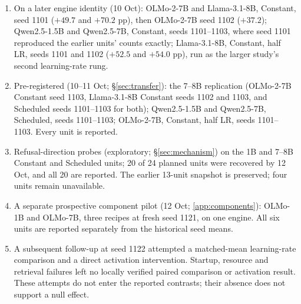 \documentclass{article}
\begin{document}
\begin{enumerate}
  \item On a later engine identity (10 Oct): OLMo-2-7B and Llama-3.1-8B,
        Constant, seed 1101 ($+49.7$ and $+70.2$ pp), then OLMo-2-7B seed 1102
        ($+37.2$); Qwen2.5-1.5B and Qwen2.5-7B, Constant, seeds 1101--1103,
        where seed 1101 reproduced the earlier units' counts exactly;
        Llama-3.1-8B, Constant, half LR, seeds 1101 and 1102 ($+52.5$ and
        $+54.0$ pp), run as the larger study's second learning-rate rung.
  \item Pre-registered (10--11 Oct; \S\ref{sec:transfer}): the 7--8B
        replication (OLMo-2-7B Constant seed 1103, Llama-3.1-8B Constant seeds
        1102 and 1103, and Scheduled seeds 1101--1103 for both); Qwen2.5-1.5B
        and Qwen2.5-7B, Scheduled, seeds 1101--1103; OLMo-2-7B, Constant, half
        LR, seeds 1101--1103. Every unit is reported.
  \item Refusal-direction probes (exploratory; \S\ref{sec:mechanism}) on the
        1B and 7--8B Constant and Scheduled units; 20 of 24 planned units
        were recovered by 12 Oct, and all 20 are reported. The earlier 13-unit
        snapshot is preserved; four units remain unavailable.
  \item A separate prospective component pilot (12 Oct; \cref{app:components}):
        OLMo-1B and OLMo-7B, three recipes at fresh seed 1121, on one engine.
        All six units are reported separately from the historical seed means.
  \item A subsequent follow-up at seed 1122 attempted a matched-mean
        learning-rate comparison and a direct activation intervention.
        Startup, resource and retrieval failures left no locally verified
        paired comparison or activation result. These attempts do not enter
        the reported contrasts; their absence does not support a null effect.
\end{enumerate}
\end{document}
